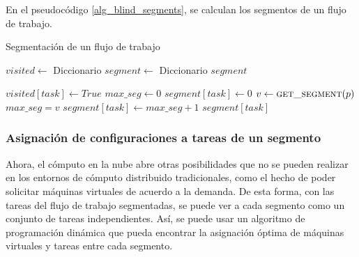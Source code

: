 En el pseudocódigo \ref{alg_blind_segments}, se calculan los segmentos de un flujo de trabajo.

\begin{algorithm}
\caption{Segmentación de un flujo de trabajo}
\label{alg_blind_segments}
\begin{algorithmic}[1]
	\State $visited \gets$ Diccionario
	\State $segment \gets$ Diccionario
		\State {}
	\EndFor
	\State \Return $segment$
\EndProcedure

	\State $visited[task] \gets True$
	\State $max\_seg \gets 0$
		\State $segment[task] \gets 0$
			\State $v \gets \Call{get\_segment}{p}$
				\State $max\_seg = v$
			\EndIf
		\EndFor
		\State $segment[task] \gets max\_seg + 1$
	\EndIf
	\State \Return $segment[task]$
\EndProcedure



		\Else
		\EndIf
	\EndFor
\EndProcedure	
\end{algorithmic}
\end{algorithm}

\subsubsection{Asignación de configuraciones a tareas de un segmento}

Ahora, el cómputo en la nube abre otras posibilidades que no se pueden realizar en los entornos de cómputo distribuido tradicionales, como el hecho de poder solicitar máquinas virtuales de acuerdo a la demanda. De esta forma, con las tareas del flujo de trabajo segmentadas, se puede ver a cada segmento como un conjunto de tareas independientes. Así, se puede usar un algoritmo de programación dinámica que pueda encontrar la asignación óptima de máquinas virtuales y tareas entre cada segmento.

